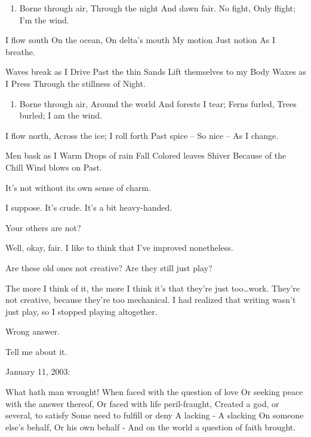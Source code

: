 \begin{enumerate}
\def\labelenumi{\Roman{enumi}.}
\setcounter{enumi}{2}
\tightlist
\item
  Borne through air, Through the night And dawn fair. No fight, Only flight; I'm the wind.
\end{enumerate}

I flow south On the ocean, On delta's mouth My motion Just notion As I breathe.

Waves break as I Drive Past the thin Sands Lift themselves to my Body Waxes as I Press Through the stillness of Night.

\begin{enumerate}
\def\labelenumi{\Roman{enumi}.}
\setcounter{enumi}{3}
\tightlist
\item
  Borne through air, Around the world And forests I tear; Ferns furled, Trees burled; I am the wind.
\end{enumerate}

I flow north, Across the ice; I roll forth Past spice -- So nice -- As I change.

Men bask as I Warm Drops of rain Fall Colored leaves Shiver Because of the Chill Wind blows on Past.

\begin{ally}
It's not without its own sense of charm.
\end{ally}
I suppose. It's crude. It's a bit heavy-handed.

\begin{ally}
Your others are not?
\end{ally}
Well, okay, fair. I like to think that I've improved nonetheless.

\begin{ally}
Are these old ones not creative? Are they still just play?
\end{ally}
The more I think of it, the more I think it's that they're just too\ldots{}work. They're not creative, because they're too mechanical. I had realized that writing wasn't just play, so I stopped playing altogether.

\begin{ally}
Wrong answer.
\end{ally}
Tell me about it.

January 11, 2003:

What hath man wrought! When faced with the question of love Or seeking peace with the answer thereof, Or faced with life peril-fraught, Created a god, or several, to satisfy Some need to fulfill or deny A lacking - A slacking On someone else's behalf, Or his own behalf - And on the world a question of faith brought.

